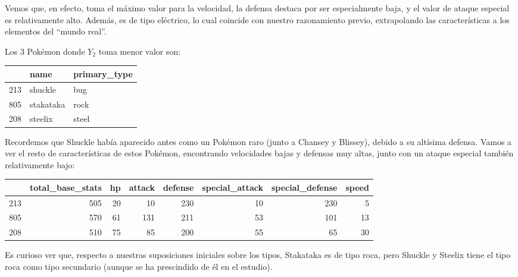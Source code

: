 \documentclass[
  12pt,
]{extreport}
\begin{document}
Vemos que, en efecto, toma el máximo valor para la velocidad, la defensa
destaca por ser especialmente baja, y el valor de ataque especial es
relativamente alto. Además, es de tipo eléctrico, lo cual coincide con
nuestro razonamiento previo, extrapolando las características a los
elementos del ``mundo real''.

Los 3 Pokémon donde \(Y_2\) toma menor valor son:

\begin{table}[H]
\centering\begingroup\fontsize{10.5}{12.5}\selectfont

\begin{tabular}{lll}
\toprule
  & name & primary\_type\\
\midrule
213 & shuckle & bug\\
805 & stakataka & rock\\
208 & steelix & steel\\
\bottomrule
\end{tabular}
\endgroup{}
\end{table}

Recordemos que Shuckle había aparecido antes como un Pokémon raro (junto
a Chansey y Blissey), debido a su altísima defensa. Vamos a ver el resto
de características de estos Pokémon, encontrando velocidades bajas y
defensas muy altas, junto con un ataque especial también relativamente
bajo:

\begin{table}[H]
\centering\begingroup\fontsize{9.5}{11.5}\selectfont

\begin{tabular}{lrrrrrrr}
\toprule
  & total\_base\_stats & hp & attack & defense & special\_attack & special\_defense & speed\\
\midrule
213 & 505 & 20 & 10 & 230 & 10 & 230 & 5\\
805 & 570 & 61 & 131 & 211 & 53 & 101 & 13\\
208 & 510 & 75 & 85 & 200 & 55 & 65 & 30\\
\bottomrule
\end{tabular}
\endgroup{}
\end{table}

Es curioso ver que, respecto a nuestras suposiciones iniciales sobre los
tipos, Stakataka es de tipo roca, pero Shuckle y Steelix tiene el tipo
roca como tipo secundario (aunque se ha prescindido de él en el
estudio).
\end{document}
